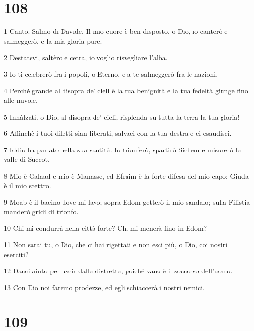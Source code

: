 \chapter{108}

\par 1 Canto. Salmo di Davide. Il mio cuore è ben disposto, o Dio, io canterò e salmeggerò, e la mia gloria pure.
\par 2 Destatevi, saltèro e cetra, io voglio risvegliare l'alba.
\par 3 Io ti celebrerò fra i popoli, o Eterno, e a te salmeggerò fra le nazioni.
\par 4 Perché grande al disopra de' cieli è la tua benignità e la tua fedeltà giunge fino alle nuvole.
\par 5 Innàlzati, o Dio, al disopra de' cieli, risplenda su tutta la terra la tua gloria!
\par 6 Affinché i tuoi diletti sian liberati, salvaci con la tua destra e ci esaudisci.
\par 7 Iddio ha parlato nella sua santità: Io trionferò, spartirò Sichem e misurerò la valle di Succot.
\par 8 Mio è Galaad e mio è Manasse, ed Efraim è la forte difesa del mio capo; Giuda è il mio scettro.
\par 9 Moab è il bacino dove mi lavo; sopra Edom getterò il mio sandalo; sulla Filistia manderò gridi di trionfo.
\par 10 Chi mi condurrà nella città forte? Chi mi menerà fino in Edom?
\par 11 Non sarai tu, o Dio, che ci hai rigettati e non esci più, o Dio, coi nostri eserciti?
\par 12 Dacci aiuto per uscir dalla distretta, poiché vano è il soccorso dell'uomo.
\par 13 Con Dio noi faremo prodezze, ed egli schiaccerà i nostri nemici.

\chapter{109}

